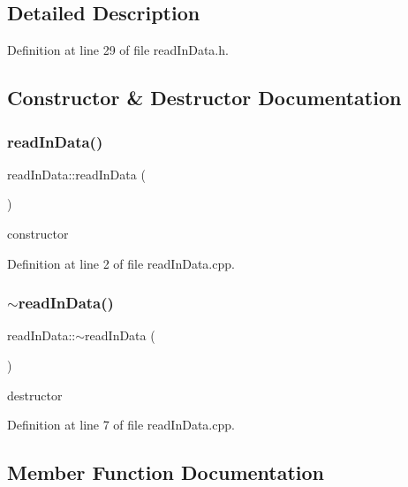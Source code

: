 \subsection{Detailed Description}


Definition at line 29 of file read\+In\+Data.\+h.



\subsection{Constructor \& Destructor Documentation}
\mbox{\label{classread_in_data_adf5f563c9d967b1291c8a26c61b33c27}} 
\subsubsection{\texorpdfstring{read\+In\+Data()}{readInData()}}
{\footnotesize\ttfamily read\+In\+Data\+::read\+In\+Data (\begin{DoxyParamCaption}{ }\end{DoxyParamCaption})}



constructor 



Definition at line 2 of file read\+In\+Data.\+cpp.

\mbox{\label{classread_in_data_af34d37cf1fb596bca7f1f9c1c97fd2eb}} 
\subsubsection{\texorpdfstring{$\sim$read\+In\+Data()}{~readInData()}}
{\footnotesize\ttfamily read\+In\+Data\+::$\sim$read\+In\+Data (\begin{DoxyParamCaption}{ }\end{DoxyParamCaption})}



destructor 



Definition at line 7 of file read\+In\+Data.\+cpp.



\subsection{Member Function Documentation}
\mbox{\label{classread_in_data_a9ae979e74958b43424cb6cf4a22043d7}} 
